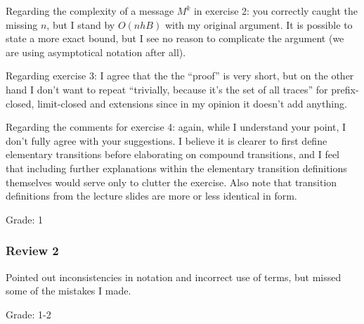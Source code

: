 Regarding the complexity of a message $M^k$ in exercise 2: you correctly caught
the missing $n$, but I stand by $O(nhB)$ with my original argument. It is
possible to state a more exact bound, but I see no reason to complicate the argument
(we are using asymptotical notation after all).

Regarding exercise 3: I agree that the the ``proof'' is very short, but on the
other hand I don't want to repeat ``trivially, because it's the set of all traces''
for prefix-closed, limit-closed and extensions since in my opinion it doesn't
add anything.

Regarding the comments for exercise 4: again, while I understand your point,
I don't fully agree with your suggestions. I believe it is clearer to first
define elementary transitions before elaborating on compound transitions,
and I feel that including further explanations within the elementary transition
definitions themselves would serve only to clutter the exercise. Also note
that transition definitions from the lecture slides are more or less identical in form.

Grade: 1

\subsubsection*{Review 2}

Pointed out inconsistencies in notation and incorrect use of terms, but missed
some of the mistakes I made.

Grade: 1-2

